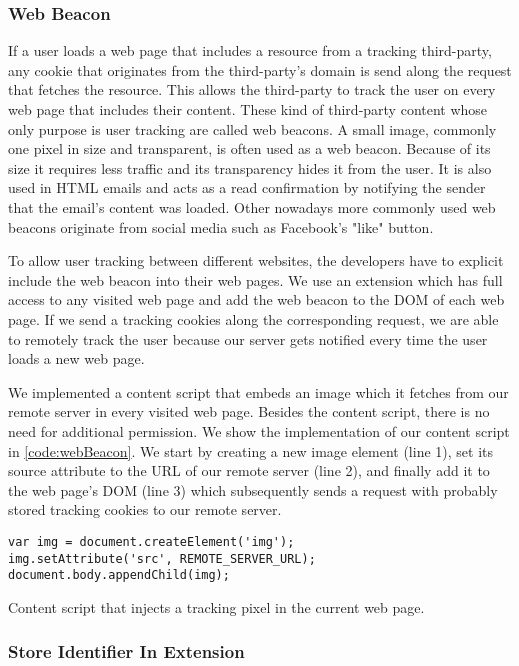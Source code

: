 \subsubsection{Web Beacon}
	
	If a user loads a web page that includes a resource from a tracking third-party, any cookie that originates from the third-party's domain is send along the request that fetches the resource. This allows the third-party to track the user on every web page that includes their content. These kind of third-party content whose only purpose is user tracking are called web beacons. A small image, commonly one pixel in size and transparent, is often used as a web beacon. Because of its size it requires less traffic and its transparency hides it from the user. It is also used in HTML emails and acts as a read confirmation by notifying the sender that the email's content was loaded. Other nowadays more commonly used web beacons originate from social media such as Facebook's "like" button. 
	
	To allow user tracking between different websites, the developers have to explicit include the web beacon into their web pages. We use an extension which has full access to any visited web page and add the web beacon to the DOM of each web page. If we send a tracking cookies along the corresponding request, we are able to remotely track the user because our server gets notified every time the user loads a new web page. 
	
	We implemented a content script that embeds an image which it fetches from our remote server in every visited web page. Besides the content script, there is no need for additional permission. We show the implementation of our content script in \autoref{code:webBeacon}. We start by creating a new image element (line 1), set its source attribute to the URL of our remote server (line 2), and finally add it to the web page's DOM (line 3) which subsequently sends a request with probably stored tracking cookies to our remote server.
	
	\begin{code}
		\begin{lstlisting}
var img = document.createElement('img');
img.setAttribute('src', REMOTE_SERVER_URL);
document.body.appendChild(img);
\end{lstlisting}
		\caption{Content script that injects a tracking pixel in the current web page.}
		\label{code:webBeacon}
	\end{code}
	

\subsubsection{Store Identifier In Extension}

